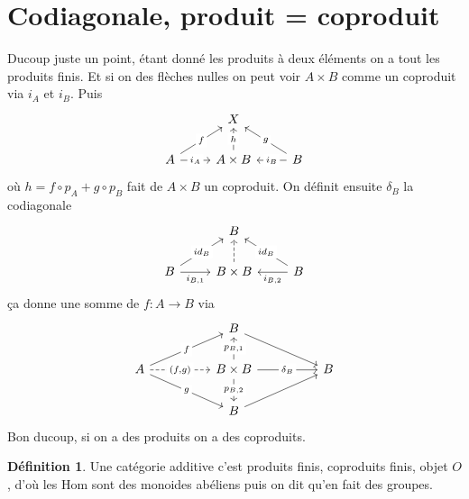 \documentclass[a4paper,12pt]{book}
\newcommand{\Hom}{\textrm{Hom}}
\theoremstyle{plain}
\theoremstyle{definition}
\newtheorem{defn}{Définition}
\theoremstyle{remark}
\begin{document}
\section{Codiagonale, produit = coproduit}
Ducoup juste un point, étant donné les produits
à deux éléments on a tout les produits finis. Et
si on des flèches nulles on peut voir $A\times B$
comme un coproduit via $i_A$ et $i_B$. Puis
\[\begin{tikzcd}
	& X \\
	A & {A\times B} & B
	\arrow["f"{description}, from=2-1, to=1-2]
	\arrow["{i_A}"{description}, from=2-1, to=2-2]
	\arrow["h"{description}, from=2-2, to=1-2]
	\arrow["g"{description}, from=2-3, to=1-2]
	\arrow["{i_B}"{description}, from=2-3, to=2-2]
\end{tikzcd}\]
où $h=f\circ p_A+g\circ p_B$ fait de $A\times B$ un coproduit.
On définit ensuite $\delta_B$ la codiagonale
\[\begin{tikzcd}
	& B \\
	B & {B\times B} & B
	\arrow["{id_B}"{description}, from=2-1, to=1-2]
	\arrow["{i_{B,1}}"', from=2-1, to=2-2]
	\arrow[dashed, from=2-2, to=1-2]
	\arrow["{id_B}"{description}, from=2-3, to=1-2]
	\arrow["{i_{B,2}}", from=2-3, to=2-2]
\end{tikzcd}\]
ça donne une somme de $f\colon A\to B$ via
\[\begin{tikzcd}
	&& B \\
	A && {B\times B} && B \\
	&& B
	\arrow[from=1-3, to=2-5]
	\arrow["f"{description}, from=2-1, to=1-3]
	\arrow["{(f,g)}"{description}, dashed, from=2-1, to=2-3]
	\arrow["g"{description}, from=2-1, to=3-3]
	\arrow["{p_{B,1}}"{description}, from=2-3, to=1-3]
	\arrow["{\delta_B}"{description}, from=2-3, to=2-5]
	\arrow["{p_{B,2}}"{description}, from=2-3, to=3-3]
	\arrow[from=3-3, to=2-5]
\end{tikzcd}\]
Bon ducoup, si on a des produits on a des coproduits. 
\begin{defn}
  Une catégorie additive c'est produits finis, coproduits finis,
  objet $O$, d'où les $\Hom$ sont des monoides abéliens puis 
  on dit qu'en fait des groupes.
\end{defn}
\end{document}
